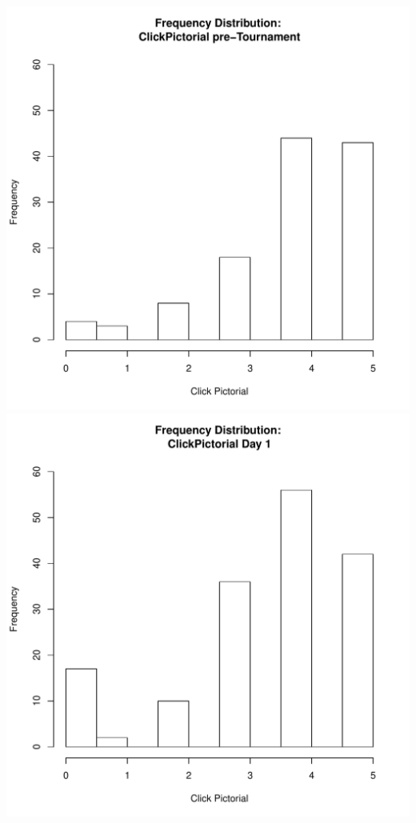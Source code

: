 \documentclass[12pt]{report}
\begin{document}
\clearpage
\includegraphics[scale =.4]{../images/distClickPictorialPre.pdf}
\includegraphics[scale =.4]{../images/distClickPictorialDay1.pdf}
\end{document}
